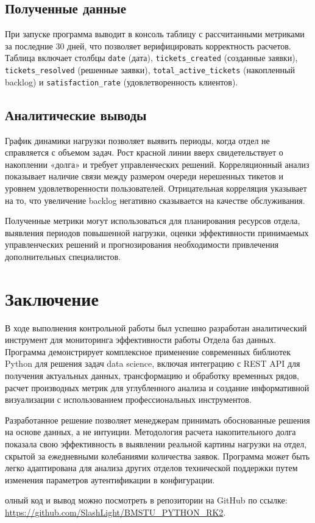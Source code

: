 \documentclass{bmstu}
\begin{document}
\section*{Полученные данные}

При запуске программа выводит в консоль таблицу с рассчитанными метриками за последние 30 дней, что позволяет верифицировать корректность расчетов. Таблица включает столбцы \texttt{date} (дата), \texttt{tickets\_created} (созданные заявки), \texttt{tickets\_resolved} (решенные заявки), \texttt{total\_active\_tickets} (накопленный backlog) и \texttt{satisfaction\_rate} (удовлетворенность клиентов).

\section*{Аналитические выводы}

График динамики нагрузки позволяет выявить периоды, когда отдел не справляется с объемом задач. Рост красной линии вверх свидетельствует о накоплении «долга» и требует управленческих решений. Корреляционный анализ показывает наличие связи между размером очереди нерешенных тикетов и уровнем удовлетворенности пользователей. Отрицательная корреляция указывает на то, что увеличение backlog негативно сказывается на качестве обслуживания.

Полученные метрики могут использоваться для планирования ресурсов отдела, выявления периодов повышенной нагрузки, оценки эффективности принимаемых управленческих решений и прогнозирования необходимости привлечения дополнительных специалистов.

\chapter*{Заключение}

В ходе выполнения контрольной работы был успешно разработан аналитический инструмент для мониторинга эффективности работы Отдела баз данных. Программа демонстрирует комплексное применение современных библиотек Python для решения задач data science, включая интеграцию с REST API для получения актуальных данных, трансформацию и обработку временных рядов, расчет производных метрик для углубленного анализа и создание информативной визуализации с использованием профессиональных инструментов.

Разработанное решение позволяет менеджерам принимать обоснованные решения на основе данных, а не интуиции. Методология расчета накопительного долга показала свою эффективность в выявлении реальной картины нагрузки на отдел, скрытой за ежедневными колебаниями количества заявок. Программа может быть легко адаптирована для анализа других отделов технической поддержки путем изменения параметров аутентификации в конфигурации. 

олный код и вывод можно посмотреть в репозитории на GitHub по ссылке: \url{https://github.com/SlashLight/BMSTU_PYTHON_RK2}.
\end{document}
